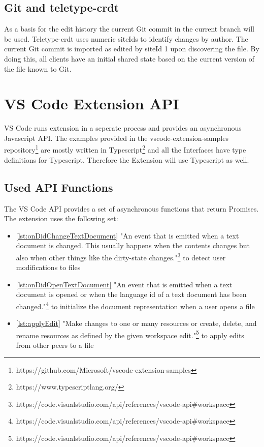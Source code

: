 \subsection{Git and teletype-crdt}
As a basis for the edit history  the current Git commit in the current branch will be used. Teletype-crdt uses numeric siteIds to identify changes by author. The current Git commit is imported as edited by siteId 1 upon discovering the file. By doing this, all clients have an initial shared state based on the current version of the file known to Git.

\section{VS Code Extension API}

VS Code runs extension in a seperate process and provides an asynchronous Javascript API.
The examples provided in the vscode-extension-samples repository\footnote{https://github.com/Microsoft/vscode-extension-samples} are mostly written in Typescript\footnote{https://www.typescriptlang.org/} and all the Interfaces have type definitions for Typescript.
Therefore the Extension will use Typescript as well.

\subsection{Used API Functions}

The VS Code API provides a set of asynchronous functions that return Promises.
The extension uses the following set:

\begin{itemize}
    \item \autoref{lst:onDidChangeTextDocument} "An event that is emitted when a text document is changed. This usually happens when the contents changes but also when other things like the dirty-state changes."\footnote{https://code.visualstudio.com/api/references/vscode-api\#workspace} to detect user modifications to files
    \item \autoref{lst:onDidOpenTextDocument} "An event that is emitted when a text document is opened or when the language id of a text document has been changed."\footnote{https://code.visualstudio.com/api/references/vscode-api\#workspace} to initialize the document representation when a user opens a file
    \item \autoref{lst:applyEdit} "Make changes to one or many resources or create, delete, and rename resources as defined by the given workspace edit."\footnote{https://code.visualstudio.com/api/references/vscode-api\#workspace} to apply edits from other peers to a file
\end{itemize}

